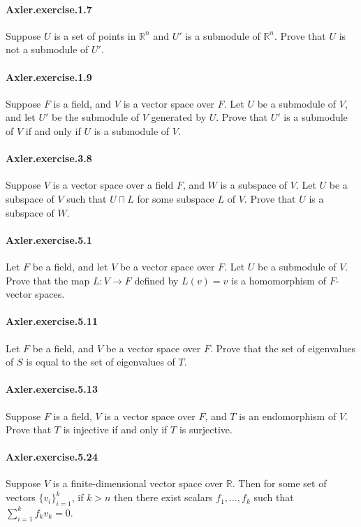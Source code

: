 \documentclass{article}
\begin{document}
\paragraph{Axler.exercise.1.7} Suppose $U$ is a set of points in $\mathbb{R}^n$ and $U'$ is a submodule of $\mathbb{R}^n$. Prove that $U$ is not a submodule of $U'$.

\paragraph{Axler.exercise.1.9} Suppose $F$ is a field, and $V$ is a vector space over $F$. Let $U$ be a submodule of $V$, and let $U'$ be the submodule of $V$ generated by $U$. Prove that $U'$ is a submodule of $V$ if and only if $U$ is a submodule of $V$.

\paragraph{Axler.exercise.3.8} Suppose $V$ is a vector space over a field $F$, and $W$ is a subspace of $V$. Let $U$ be a subspace of $V$ such that $U ⊓ L$ for some subspace $L$ of $V$. Prove that $U$ is a subspace of $W$.

\paragraph{Axler.exercise.5.1} Let $F$ be a field, and let $V$ be a vector space over $F$. Let $U$ be a submodule of $V$. Prove that the map $L: V → F$ defined by $L(v) = v$ is a homomorphism of $F$-vector spaces.

\paragraph{Axler.exercise.5.11} Let $F$ be a field, and $V$ be a vector space over $F$. Prove that the set of eigenvalues of $S$ is equal to the set of eigenvalues of $T$.

\paragraph{Axler.exercise.5.13} Suppose $F$ is a field, $V$ is a vector space over $F$, and $T$ is an endomorphism of $V$. Prove that $T$ is injective if and only if $T$ is surjective.

\paragraph{Axler.exercise.5.24} Suppose $V$ is a finite-dimensional vector space over $\mathbb{R}$. Then for some set of vectors $\{v_i\}_{i=1}^k$, if $k>n$ then there exist scalars $f_1, \dots, f_k$ such that $\sum_{i=1}^k f_kv_k = 0$.
\end{document}
